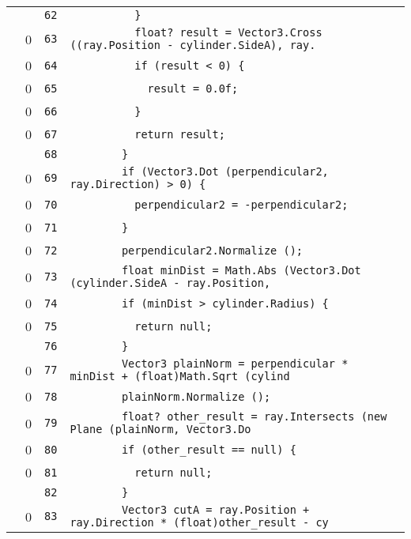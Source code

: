 \documentclass[a4paper,10pt]{article}
\begin{document}
\begin{longtable}[l]{lrrl}
\cellcolor{gray} &  & \verb~62~ & \verb~          }~\\
\cellcolor{red} & 0 & \verb~63~ & \verb~          float? result = Vector3.Cross ((ray.Position - cylinder.SideA), ray.~\\
\cellcolor{red} & 0 & \verb~64~ & \verb~          if (result < 0) {~\\
\cellcolor{red} & 0 & \verb~65~ & \verb~            result = 0.0f;~\\
\cellcolor{red} & 0 & \verb~66~ & \verb~          }~\\
\cellcolor{red} & 0 & \verb~67~ & \verb~          return result;~\\
\cellcolor{gray} &  & \verb~68~ & \verb~        }~\\
\cellcolor{red} & 0 & \verb~69~ & \verb~        if (Vector3.Dot (perpendicular2, ray.Direction) > 0) {~\\
\cellcolor{red} & 0 & \verb~70~ & \verb~          perpendicular2 = -perpendicular2;~\\
\cellcolor{red} & 0 & \verb~71~ & \verb~        }~\\
\cellcolor{red} & 0 & \verb~72~ & \verb~        perpendicular2.Normalize ();~\\
\cellcolor{red} & 0 & \verb~73~ & \verb~        float minDist = Math.Abs (Vector3.Dot (cylinder.SideA - ray.Position, ~\\
\cellcolor{red} & 0 & \verb~74~ & \verb~        if (minDist > cylinder.Radius) {~\\
\cellcolor{red} & 0 & \verb~75~ & \verb~          return null;~\\
\cellcolor{gray} &  & \verb~76~ & \verb~        }~\\
\cellcolor{red} & 0 & \verb~77~ & \verb~        Vector3 plainNorm = perpendicular * minDist + (float)Math.Sqrt (cylind~\\
\cellcolor{red} & 0 & \verb~78~ & \verb~        plainNorm.Normalize ();~\\
\cellcolor{red} & 0 & \verb~79~ & \verb~        float? other_result = ray.Intersects (new Plane (plainNorm, Vector3.Do~\\
\cellcolor{red} & 0 & \verb~80~ & \verb~        if (other_result == null) {~\\
\cellcolor{red} & 0 & \verb~81~ & \verb~          return null;~\\
\cellcolor{gray} &  & \verb~82~ & \verb~        }~\\
\cellcolor{red} & 0 & \verb~83~ & \verb~        Vector3 cutA = ray.Position + ray.Direction * (float)other_result - cy~\\

\end{longtable}
\end{document}
